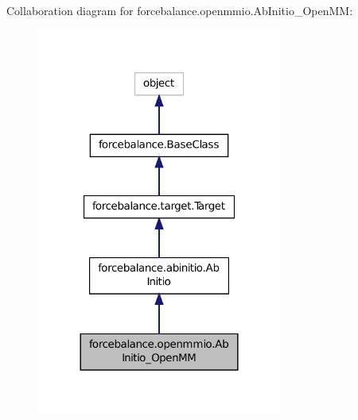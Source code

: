 Collaboration diagram for forcebalance.\-openmmio.\-Ab\-Initio\-\_\-\-Open\-M\-M\-:\nopagebreak
\begin{figure}[H]
\begin{center}
\leavevmode
\includegraphics[width=228pt]{classforcebalance_1_1openmmio_1_1AbInitio__OpenMM__coll__graph}
\end{center}
\end{figure}
